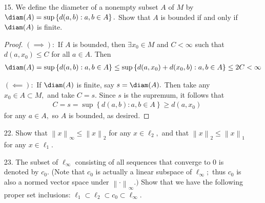 \documentclass{article}
\begin{document}
\begin{itemize}
\begin{proof}
			$\tau:$ Clearly $\tau$ is non-negative since $d$ and $1$ are non-negative, and
			\begin{align*}
				\tau(x, y) = 0 = \min\left\{ d(x, y), 1 \right\}\iff d(x, y) = 0\iff x=y
			\end{align*}
			It is also symmetric because $d$ is symmetric. Suppose that
			\begin{align*}
				\tau(x, y)+\tau(y, z) &< \tau(x, z) \\
				\min\left\{ d(x, y), 1 \right\} +\min\left\{ d(y, z), 1 \right\} = m_1+m_2 &< \min\left\{ d(x, z), 1 \right\} \\
				\implies m_1+m_2 &< 1, \quad m_1+m_2<d(x, z)
			\end{align*}
			If $m_1+m_2<1,$ then we must have $m_1=d(x, y)$ and $m_2=d(y, z),$ but since $d$ is a metric, $m_1+m_2=d(x, y)+d(y, z) \ge d(x, z),$ so it is impossible for both conditions to be true. Contradiction, so $\tau(x, y)+\tau(y, z)\ge \tau(x, z),$ and $\tau$ is a metric.
		\end{proof}

	\item[15.] We define the diameter of a nonempty subset $A$ of $M$ by $\diam(A)=\sup\left\{ d(a, b):a, b\in A \right\}.$ Show that $A$ is bounded if and only if $\diam(A)$ is finite.
		\begin{proof}
			$(\implies):$ If $A$ is bounded, then $\exists x_0\in M$ and $C<\infty$ such that $d(a, x_0)\le C$ for all $a\in A.$ Then
			\begin{align*}
				\diam(A) = \sup\left\{ d(a, b):a, b\in A \right\} \le \sup\left\{ d(a, x_0)+d(x_0, b):a, b\in A \right\} \le 2C <\infty
			\end{align*}

			$(\impliedby):$ If $\diam(A)$ is finite, say $s=\diam(A).$ Then take any $x_0\in A\subset M,$ and take $C=s.$ Since $s$ is the supremum, it follows that
			\begin{align*}
				C = s =\sup\left\{ d(a, b):a, b\in A \right\} \ge d(a, x_0)
			\end{align*}
			for any $a\in A,$ so $A$ is bounded, as desired.
		\end{proof}

	\item[22.] Show that $\left\lVert x \right\rVert_\infty\le\left\lVert x \right\rVert_2$ for any $x\in\ell_2,$ and that $\left\lVert x \right\rVert_2\le\left\lVert x \right\rVert_1$ for any $x\in\ell_1.$

	\item[23.] The subset of $\ell_\infty$ consisting of all sequences that converge to 0 is denoted by $c_0.$ (Note that $c_0$ is actually a linear subspace of $\ell_\infty;$ thus $c_0$ is also a normed vector space under $\left\lVert \cdot \right\rVert_\infty.)$ Show that we have the following proper set inclusions: $\ell_1\subset\ell_2\subset c_0\subset\ell_\infty.$


\end{itemize}
\end{document}
